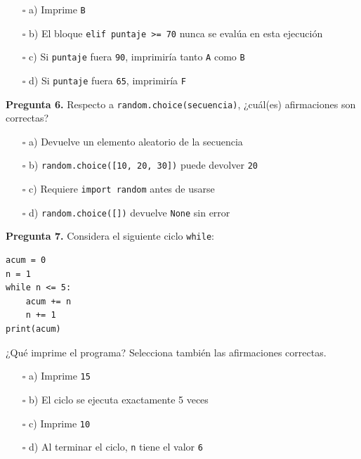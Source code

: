 \documentclass[12pt,a4paper]{article}
\begin{document}
\begin{enumerate}[label=\alph*), leftmargin=2em, itemsep=4pt]
  \item[$\square$ a)] Imprime \texttt{B}
  \item[$\square$ b)] El bloque \lstinline|elif puntaje >= 70| nunca se evalúa en esta ejecución
  \item[$\square$ c)] Si \texttt{puntaje} fuera \texttt{90}, imprimiría tanto \texttt{A} como \texttt{B}
  \item[$\square$ d)] Si \texttt{puntaje} fuera \texttt{65}, imprimiría \texttt{F}
\end{enumerate}

\bigskip

\noindent\textbf{Pregunta 6.} Respecto a \lstinline|random.choice(secuencia)|, ¿cuál(es) afirmaciones son correctas?

\begin{enumerate}[label=\alph*), leftmargin=2em, itemsep=4pt]
  \item[$\square$ a)] Devuelve un elemento aleatorio de la secuencia
  \item[$\square$ b)] \lstinline|random.choice([10, 20, 30])| puede devolver \texttt{20}
  \item[$\square$ c)] Requiere \lstinline|import random| antes de usarse
  \item[$\square$ d)] \lstinline|random.choice([])| devuelve \texttt{None} sin error
\end{enumerate}

\bigskip

\noindent\textbf{Pregunta 7.} Considera el siguiente ciclo \texttt{while}:
\begin{lstlisting}[style=PythonStyle]
acum = 0
n = 1
while n <= 5:
    acum += n
    n += 1
print(acum)
\end{lstlisting}
¿Qué imprime el programa? Selecciona también las afirmaciones correctas.

\begin{enumerate}[label=\alph*), leftmargin=2em, itemsep=4pt]
  \item[$\square$ a)] Imprime \texttt{15}
  \item[$\square$ b)] El ciclo se ejecuta exactamente 5 veces
  \item[$\square$ c)] Imprime \texttt{10}
  \item[$\square$ d)] Al terminar el ciclo, \texttt{n} tiene el valor \texttt{6}
\end{enumerate}
\end{document}

